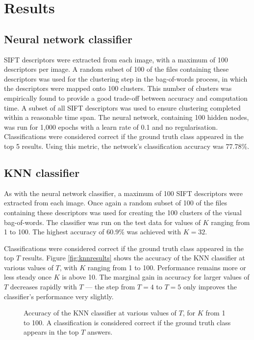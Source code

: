 \section{Results}

\subsection{Neural network classifier}
SIFT descriptors were extracted from each image, with a maximum of 100 descriptors per image.
A random subset of 100 of the files containing these descriptors was used for the clustering step in the bag-of-words process, in which the descriptors were mapped onto 100 clusters.
This number of clusters was empirically found to provide a good trade-off between accuracy and computation time.
A subset of all SIFT descriptors was used to ensure clustering completed within a reasonable time span.
The neural network, containing 100 hidden nodes, was run for 1,000 epochs with a learn rate of 0.1 and no regularisation.
Classifications were considered correct if the ground truth class appeared in the top 5 results.
Using this metric, the network's classification accuracy was 77.78\%.

\subsection{KNN classifier}
As with the neural network classifier, a maximum of 100 SIFT descriptors were extracted from each image.
Once again a random subset of 100 of the files containing these descriptors was used for creating the 100 clusters of the visual bag-of-words.
The classifier was run on the test data for values of $K$ ranging from 1 to 100.
The highest accuracy of 60.9\% was achieved with $K = 32$.

Classifications were considered correct if the ground truth class appeared in the top $T$ results.
Figure \vref{fig:knnresults} shows the accuracy of the KNN classifier at various values of $T$, with $K$ ranging from 1 to 100.
Performance remains more or less steady once $K$ is above 10.
The marginal gain in accuracy for larger values of $T$ decreases rapidly with $T$ --- the step from $T=4$ to $T=5$ only improves the classifier's performance very slightly.


\begin{figure}[htb]
	\centering
	\caption{Accuracy of the KNN classifier at various values of $T$, for $K$ from 1 to 100. A classification is considered correct if the ground truth class appears in the top $T$ answers.}
	\label{fig:knnresults}
\end{figure}
